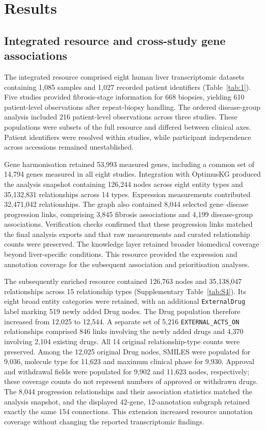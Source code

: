 \documentclass[11pt,a4paper]{article}
\begin{document}
\section*{Results}




\subsection*{Integrated resource and cross-study gene associations}
The integrated resource comprised eight human liver transcriptomic datasets containing 1,085 samples and 1,027 recorded patient identifiers (Table~\ref{tab:1}). Five studies provided fibrosis-stage information for 668 biopsies, yielding 610 patient-level observations after repeat-biopsy handling. The ordered disease-group analysis included 216 patient-level observations across three studies. These populations were subsets of the full resource and differed between clinical axes. Patient identifiers were resolved within studies, while participant independence across accessions remained unestablished.

Gene harmonisation retained 53,993 measured genes, including a common set of 14,794 genes measured in all eight studies. Integration with OptimusKG produced the analysis snapshot containing 126,244 nodes across eight entity types and 35,132,831 relationships across 14 types. Expression measurements contributed 32,471,042 relationships. The graph also contained 8,044 selected gene–disease progression links, comprising 3,845 fibrosis associations and 4,199 disease-group associations. Verification checks confirmed that these progression links matched the final analysis exports and that raw measurements and curated relationship counts were preserved. The knowledge layer retained broader biomedical coverage beyond liver-specific conditions. This resource provided the expression and annotation coverage for the subsequent association and prioritisation analyses.

The subsequently enriched resource contained 126,763 nodes and 35,138,047 relationships across 15 relationship types (Supplementary Table~\ref{tab:S4}). Its eight broad entity categories were retained, with an additional \texttt{ExternalDrug} label marking 519 newly added Drug nodes. The Drug population therefore increased from 12,025 to 12,544. A separate set of 5,216 \texttt{EXTERNAL\_ACTS\_ON} relationships comprised 846 links involving the newly added drugs and 4,370 involving 2,104 existing drugs. All 14 original relationship-type counts were preserved. Among the 12,025 original Drug nodes, SMILES were populated for 9,036, molecule type for 11,623 and maximum clinical phase for 9,930. Approval and withdrawal fields were populated for 9,902 and 11,623 nodes, respectively; these coverage counts do not represent numbers of approved or withdrawn drugs. The 8,044 progression relationships and their association statistics matched the analysis snapshot, and the displayed 42-gene, 12-annotation subgraph retained exactly the same 154 connections. This extension increased resource annotation coverage without changing the reported transcriptomic findings.
\end{document}

